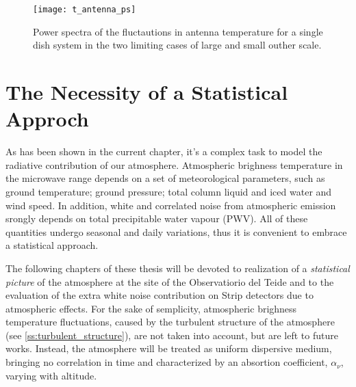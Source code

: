\begin{figure}
        \centering
        \texttt{[image: t\_antenna\_ps]}
        \caption{Power spectra of the fluctautions in antenna temperature
        for a single dish system in the two limiting cases of large and
        small outher scale.}
        \label{fig:t_antenna_ps}
\end{figure}

\section{The Necessity of a Statistical Approch}

As has been shown in the current chapter, it's a complex task to model
the radiative contribution of our atmosphere. Atmospheric brighness
temperature in the microwave range depends on a set of
meteorological parameters, such as ground temperature; ground pressure;
total column liquid and iced water and wind speed. In addition,
white and correlated noise from atmospheric emission
srongly depends on total precipitable water vapour (PWV).
All of these quantities undergo seasonal and daily variations, thus
it is convenient to embrace a statistical approach.

The following chapters of these thesis will be devoted to realization of a
\emph{statistical picture} of the atmosphere at the site of the
Observatiorio del Teide and to the evaluation of the extra white noise
contribution on Strip detectors due to atmospheric effects. For the sake of
semplicity, atmospheric brighness temperature fluctuations, caused by
the turbulent structure of the atmosphere (see
\autoref{ss:turbulent_structure}), are not taken into account, but
are left to future works. Instead, the atmosphere will be treated as
uniform dispersive medium, bringing no correlation in time and
characterized by an absortion coefficient, $\alpha_\nu$, varying with
altitude.
